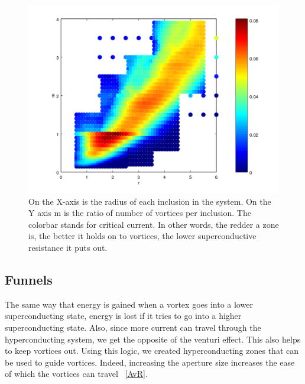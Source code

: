 \begin{figure}[htbp]
\begin{center}
\includegraphics[scale=.50]{HDFinal.png}
\caption{ On the X-axis is the radius of each inclusion in the system. On the Y axis m is the ratio of number of vortices per inclusion. The colorbar stands for critical current. In other words, the redder a zone is, the better it holds on to vortices, the lower superconductive resistance it puts out.}
\label{HDF}
\end{center}
\end{figure}
 

\subsection{Funnels}
The same way that energy is gained when a vortex goes into a lower superconducting state, energy is lost if it tries to go into a higher superconducting state. Also, since more current can travel through the hyperconducting system, we get the opposite of the venturi effect. This also helps to keep vortices out. Using this logic, we created hyperconducting zones that can be used to guide vortices. Indeed, increasing the aperture size increases the ease of which the vortices can travel ~\ref{AvR}. 

